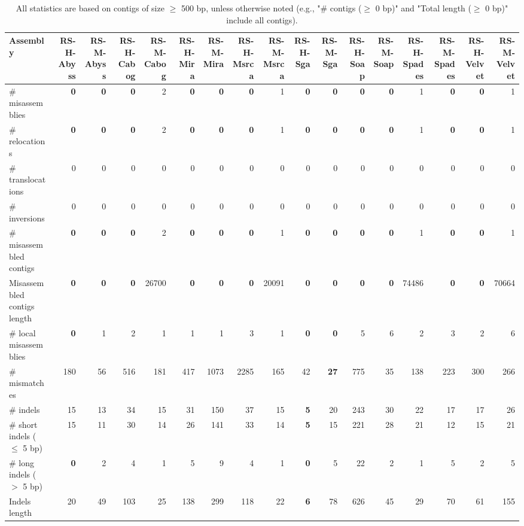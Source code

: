 \documentclass[12pt,a4paper]{article}
\begin{document}
\begin{table}[ht]
\begin{center}
\caption{All statistics are based on contigs of size $\geq$ 500 bp, unless otherwise noted (e.g., "\# contigs ($\geq$ 0 bp)" and "Total length ($\geq$ 0 bp)" include all contigs).}
\begin{tabular}{|l*{16}{|r}|}
\hline
Assembly & RS-H-Abyss & RS-M-Abyss & RS-H-Cabog & RS-M-Cabog & RS-H-Mira & RS-M-Mira & RS-H-Msrca & RS-M-Msrca & RS-H-Sga & RS-M-Sga & RS-H-Soap & RS-M-Soap & RS-H-Spades & RS-M-Spades & RS-H-Velvet & RS-M-Velvet \\ \hline
\# misassemblies & {\bf 0} & {\bf 0} & {\bf 0} & 2 & {\bf 0} & {\bf 0} & {\bf 0} & 1 & {\bf 0} & {\bf 0} & {\bf 0} & {\bf 0} & 1 & {\bf 0} & {\bf 0} & 1 \\ \hline
\hspace{5mm}\# relocations & {\bf 0} & {\bf 0} & {\bf 0} & 2 & {\bf 0} & {\bf 0} & {\bf 0} & 1 & {\bf 0} & {\bf 0} & {\bf 0} & {\bf 0} & 1 & {\bf 0} & {\bf 0} & 1 \\ \hline
\hspace{5mm}\# translocations & 0 & 0 & 0 & 0 & 0 & 0 & 0 & 0 & 0 & 0 & 0 & 0 & 0 & 0 & 0 & 0 \\ \hline
\hspace{5mm}\# inversions & 0 & 0 & 0 & 0 & 0 & 0 & 0 & 0 & 0 & 0 & 0 & 0 & 0 & 0 & 0 & 0 \\ \hline
\# misassembled contigs & {\bf 0} & {\bf 0} & {\bf 0} & 2 & {\bf 0} & {\bf 0} & {\bf 0} & 1 & {\bf 0} & {\bf 0} & {\bf 0} & {\bf 0} & 1 & {\bf 0} & {\bf 0} & 1 \\ \hline
Misassembled contigs length & {\bf 0} & {\bf 0} & {\bf 0} & 26700 & {\bf 0} & {\bf 0} & {\bf 0} & 20091 & {\bf 0} & {\bf 0} & {\bf 0} & {\bf 0} & 74486 & {\bf 0} & {\bf 0} & 70664 \\ \hline
\# local misassemblies & {\bf 0} & 1 & 2 & 1 & 1 & 1 & 3 & 1 & {\bf 0} & {\bf 0} & 5 & 6 & 2 & 3 & 2 & 6 \\ \hline
\# mismatches & 180 & 56 & 516 & 181 & 417 & 1073 & 2285 & 165 & 42 & {\bf 27} & 775 & 35 & 138 & 223 & 300 & 266 \\ \hline
\# indels & 15 & 13 & 34 & 15 & 31 & 150 & 37 & 15 & {\bf 5} & 20 & 243 & 30 & 22 & 17 & 17 & 26 \\ \hline
\hspace{5mm}\# short indels ($\leq$ 5 bp) & 15 & 11 & 30 & 14 & 26 & 141 & 33 & 14 & {\bf 5} & 15 & 221 & 28 & 21 & 12 & 15 & 21 \\ \hline
\hspace{5mm}\# long indels ($>$ 5 bp) & {\bf 0} & 2 & 4 & 1 & 5 & 9 & 4 & 1 & {\bf 0} & 5 & 22 & 2 & 1 & 5 & 2 & 5 \\ \hline
Indels length & 20 & 49 & 103 & 25 & 138 & 299 & 118 & 22 & {\bf 6} & 78 & 626 & 45 & 29 & 70 & 61 & 155 \\ \hline
\end{tabular}
\end{center}
\end{table}
\end{document}
